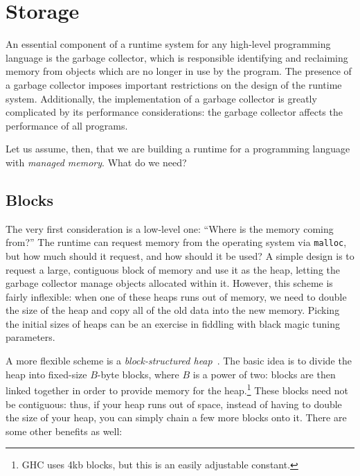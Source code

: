 \section{Storage}

An essential component of a runtime system for any high-level
programming language is the garbage collector, which is responsible
identifying and reclaiming memory from objects which are no longer in
use by the program.
The presence of a garbage collector imposes important restrictions on
the design of the runtime system.  Additionally, the implementation of a
garbage collector is greatly complicated by its performance
considerations: the garbage collector affects the performance of all
programs.

Let us assume, then, that we are building a runtime for a programming
language with \emph{managed memory}.  What do we need?

\subsection{Blocks}

The very first consideration is a low-level one: ``Where is the memory coming
from?''  The runtime can request memory from the operating system via
\verb|malloc|, but how much should it request, and how should it be
used?  A simple design is to request a large, contiguous block of memory
and use it as the heap, letting the garbage collector manage objects allocated
within it.  However, this scheme is fairly inflexible: when one of these heaps
runs out of memory, we need to double the size of the heap and copy all of the
old data into the new memory.  Picking the initial sizes of heaps can be an exercise
in fiddling with black magic tuning parameters.

A more flexible scheme is a \emph{block-structured heap}~\cite{Marlow:2008:PGG:1375634.1375637}.
The basic idea is to divide the heap into fixed-size $B$-byte blocks,
where $B$ is a power of two: blocks are then linked together in order to
provide memory for the heap.\footnote{GHC uses 4kb blocks, but this is an easily
adjustable constant.}  These blocks need not be contiguous: thus, if your
heap runs out of space, instead of having to double the size of your heap,
you can simply chain a few more blocks onto it.  There are some other benefits as well:

